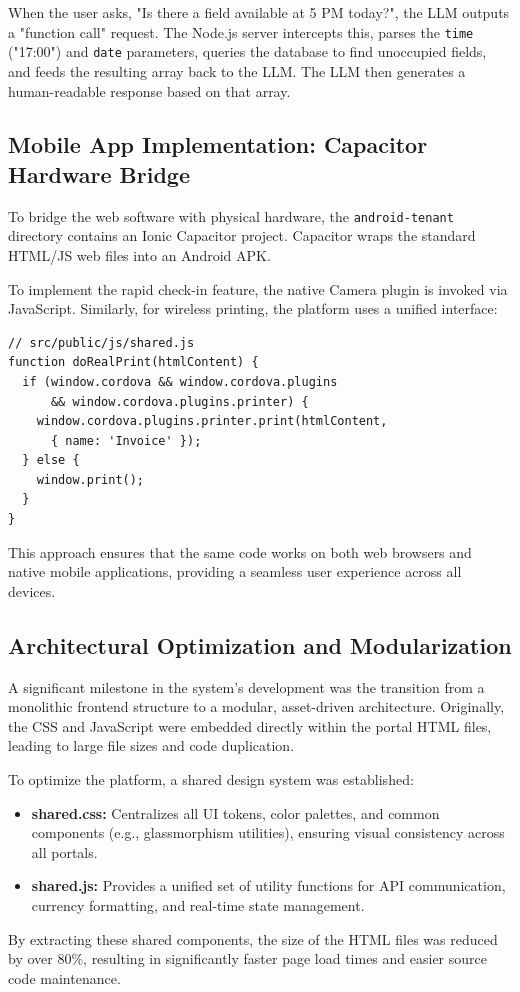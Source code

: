 When the user asks, "Is there a field available at 5 PM today?", the LLM outputs a "function call" request. The Node.js server intercepts this, parses the \texttt{time} ("17:00") and \texttt{date} parameters, queries the database to find unoccupied fields, and feeds the resulting array back to the LLM. The LLM then generates a human-readable response based on that array.

\subsection{Mobile App Implementation: Capacitor Hardware Bridge}
To bridge the web software with physical hardware, the \texttt{android-tenant} directory contains an Ionic Capacitor project. Capacitor wraps the standard HTML/JS web files into an Android APK.

To implement the rapid check-in feature, the native Camera plugin is invoked via JavaScript. Similarly, for wireless printing, the platform uses a unified interface:
\begin{verbatim}
// src/public/js/shared.js
function doRealPrint(htmlContent) {
  if (window.cordova && window.cordova.plugins 
      && window.cordova.plugins.printer) {
    window.cordova.plugins.printer.print(htmlContent, 
      { name: 'Invoice' });
  } else {
    window.print();
  }
}
\end{verbatim}
This approach ensures that the same code works on both web browsers and native mobile applications, providing a seamless user experience across all devices.

\subsection{Architectural Optimization and Modularization}
A significant milestone in the system's development was the transition from a monolithic frontend structure to a modular, asset-driven architecture. Originally, the CSS and JavaScript were embedded directly within the portal HTML files, leading to large file sizes and code duplication.

To optimize the platform, a shared design system was established:
\begin{itemize}
    \item \textbf{shared.css:} Centralizes all UI tokens, color palettes, and common components (e.g., glassmorphism utilities), ensuring visual consistency across all portals.
    \item \textbf{shared.js:} Provides a unified set of utility functions for API communication, currency formatting, and real-time state management.
\end{itemize}
By extracting these shared components, the size of the HTML files was reduced by over 80\%, resulting in significantly faster page load times and easier source code maintenance.

